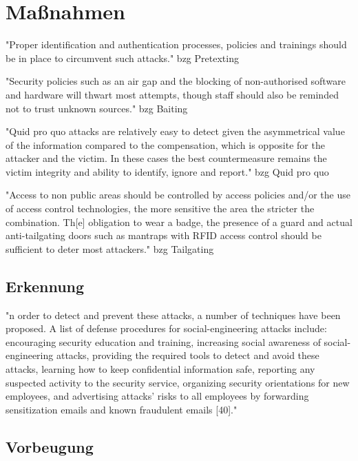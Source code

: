 \chapter{Maßnahmen}
\label{chapter:massnahmen}

"Proper identification and authentication processes, policies and trainings should be in place to circumvent such attacks."\cite{1_enisa}
bzg Pretexting

"Security policies such as an air gap and the blocking of non-authorised software and hardware will thwart most attempts,
though staff should also be reminded not to trust unknown sources."\cite{1_enisa}
bzg Baiting

"Quid pro quo attacks are relatively easy to detect given the asymmetrical value of the information compared to the compensation,
which is opposite for the attacker and the victim. In these cases the best countermeasure remains the victim integrity and ability to identify, ignore and report."\cite{1_enisa}
bzg Quid pro quo

"Access to non public areas should be controlled by access policies and/or the use of access control technologies, the more sensitive the area the stricter the combination.
Th[e] obligation to wear a badge, the presence of a guard and actual anti-tailgating doors such as mantraps with RFID access control should be sufficient to deter most attackers."\cite{1_enisa}
bzg Tailgating




\section{Erkennung}

"n order to detect and prevent these attacks, a number of techniques have been proposed. A list of defense procedures for social-engineering attacks include: encouraging security
education and training, increasing social awareness of social-engineering attacks, providing the required tools to detect and avoid these attacks, learning how to keep
confidential information safe, reporting any suspected activity to the security service, organizing security orientations for new employees, and advertising attacks’ risks to
all employees by forwarding sensitization emails and known fraudulent emails [40]."\cite{4_mdpi}

\section{Vorbeugung}

